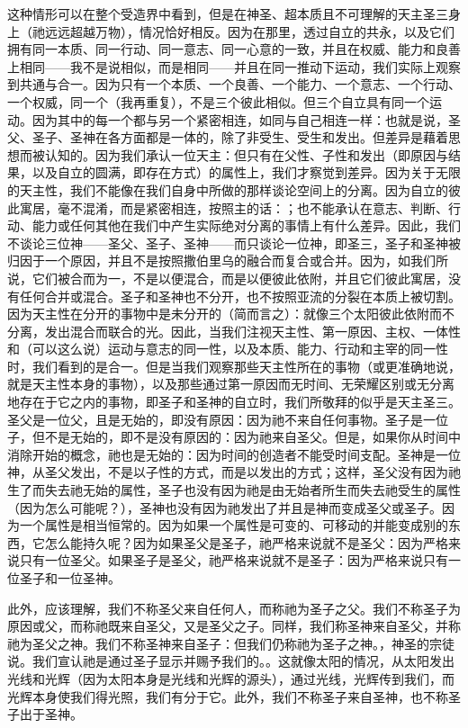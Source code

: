 这种情形可以在整个受造界中看到，但是在神圣、超本质且不可理解的天主圣三身上（祂远远超越万物），情况恰好相反。因为在那里，透过自立的共永，以及它们拥有同一本质、同一行动、同一意志、同一心意的一致，并且在权威、能力和良善上相同——我不是说相似，而是相同——并且在同一推动下运动，我们实际上观察到共通与合一。因为只有一个本质、一个良善、一个能力、一个意志、一个行动、一个权威，同一个（我再重复），不是三个彼此相似。但三个自立具有同一个运动。因为其中的每一个都与另一个紧密相连，如同与自己相连一样：也就是说，圣父、圣子、圣神在各方面都是一体的，除了非受生、受生和发出。但差异是藉着思想而被认知的。因为我们承认一位天主：但只有在父性、子性和发出（即原因与结果，以及自立的圆满，即存在方式）的属性上，我们才察觉到差异。因为关于无限的天主性，我们不能像在我们自身中所做的那样谈论空间上的分离。因为自立的彼此寓居，毫不混淆，而是紧密相连，按照主的话：；也不能承认在意志、判断、行动、能力或任何其他在我们中产生实际绝对分离的事情上有什么差异。因此，我们不谈论三位神——圣父、圣子、圣神——而只谈论一位神，即圣三，圣子和圣神被归因于一个原因，并且不是按照撒伯里乌的融合而复合或合并。因为，如我们所说，它们被合而为一，不是以便混合，而是以便彼此依附，并且它们彼此寓居，没有任何合并或混合。圣子和圣神也不分开，也不按照亚流的分裂在本质上被切割。因为天主性在分开的事物中是未分开的（简而言之）：就像三个太阳彼此依附而不分离，发出混合而联合的光。因此，当我们注视天主性、第一原因、主权、一体性和（可以这么说）运动与意志的同一性，以及本质、能力、行动和主宰的同一性时，我们看到的是合一。但是当我们观察那些天主性所在的事物（或更准确地说，就是天主性本身的事物），以及那些通过第一原因而无时间、无荣耀区别或无分离地存在于它之内的事物，即圣子和圣神的自立时，我们所敬拜的似乎是天主圣三。圣父是一位父，且是无始的，即没有原因：因为祂不来自任何事物。圣子是一位子，但不是无始的，即不是没有原因的：因为祂来自圣父。但是，如果你从时间中消除开始的概念，祂也是无始的：因为时间的创造者不能受时间支配。圣神是一位神，从圣父发出，不是以子性的方式，而是以发出的方式；这样，圣父没有因为祂生了而失去祂无始的属性，圣子也没有因为祂是由无始者所生而失去祂受生的属性（因为怎么可能呢？），圣神也没有因为祂发出了并且是神而变成圣父或圣子。因为一个属性是相当恒常的。因为如果一个属性是可变的、可移动的并能变成别的东西，它怎么能持久呢？因为如果圣父是圣子，祂严格来说就不是圣父：因为严格来说只有一位圣父。如果圣子是圣父，祂严格来说就不是圣子：因为严格来说只有一位圣子和一位圣神。\par

此外，应该理解，我们不称圣父来自任何人，而称祂为圣子之父。我们不称圣子为原因或父，而称祂既来自圣父，又是圣父之子。同样，我们称圣神来自圣父，并称祂为圣父之神。我们不称圣神来自圣子：但我们仍称祂为圣子之神。，神圣的宗徒说。我们宣认祂是通过圣子显示并赐予我们的。。这就像太阳的情况，从太阳发出光线和光辉（因为太阳本身是光线和光辉的源头），通过光线，光辉传到我们，而光辉本身使我们得光照，我们有分于它。此外，我们不称圣子来自圣神，也不称圣子出于圣神。\par

